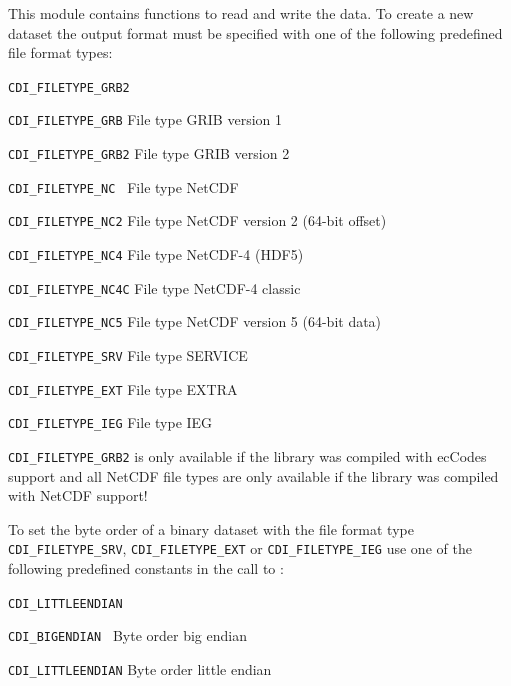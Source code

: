 This module contains functions to read and write the data.
To create a new dataset the output format must be specified
with one of the following predefined file format types:

\vspace*{3mm}
\hspace*{8mm}\begin{minipage}{15cm}
\begin{deflist}{\large\texttt{CDI\_FILETYPE\_GRB2 \ \ }}
\item[{\large\texttt{CDI\_FILETYPE\_GRB}}]   File type GRIB version 1
\item[{\large\texttt{CDI\_FILETYPE\_GRB2}}]  File type GRIB version 2          
\item[{\large\texttt{CDI\_FILETYPE\_NC }}]   File type NetCDF
\item[{\large\texttt{CDI\_FILETYPE\_NC2}}]   File type NetCDF version 2 (64-bit offset)
\item[{\large\texttt{CDI\_FILETYPE\_NC4}}]   File type NetCDF-4 (HDF5)
\item[{\large\texttt{CDI\_FILETYPE\_NC4C}}]  File type NetCDF-4 classic
\item[{\large\texttt{CDI\_FILETYPE\_NC5}}]   File type NetCDF version 5 (64-bit data)
\item[{\large\texttt{CDI\_FILETYPE\_SRV}}]   File type SERVICE
\item[{\large\texttt{CDI\_FILETYPE\_EXT}}]   File type EXTRA
\item[{\large\texttt{CDI\_FILETYPE\_IEG}}]   File type IEG
\end{deflist}
\end{minipage}
\vspace*{3mm}

\texttt{CDI\_FILETYPE\_GRB2} is only available if the {\CDI} library was compiled with ecCodes support and all NetCDF file types are only available if the {\CDI} library was compiled with NetCDF support!

To set the byte order of a binary dataset with the file format
type \texttt{CDI\_FILETYPE\_SRV}, \texttt{CDI\_FILETYPE\_EXT} or \texttt{CDI\_FILETYPE\_IEG} use one of the
following predefined constants in the call to {}:

\vspace*{3mm}
\hspace*{8mm}\begin{minipage}{15cm}
\begin{deflist}{\large\texttt{CDI\_LITTLEENDIAN \ \ }}
\item[{\large\texttt{CDI\_BIGENDIAN   }}]  Byte order big endian
\item[{\large\texttt{CDI\_LITTLEENDIAN}}]  Byte order little endian
\end{deflist}
\end{minipage}
\vspace*{3mm}
